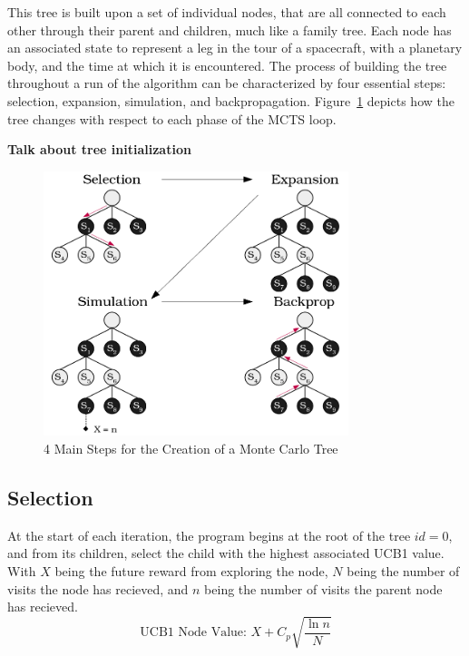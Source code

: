 \documentclass[letterpaper, preprint, paper,11pt]{AAS}	%
\begin{document}
This tree is built upon a set of individual nodes, that are all connected to each other through their parent and children, much like a family tree. Each node has an associated state to represent a leg in the tour of a spacecraft, with a planetary body, and the time at which it is encountered. The process of building the tree throughout a run of the algorithm can be characterized by four essential steps: selection, expansion, simulation, and backpropagation. Figure~\ref*{fig:mctsFunc} depicts how the tree changes with respect to each phase of the MCTS loop. 

\textbf{Talk about tree initialization}

\begin{figure}[htb]
	\centering\includegraphics[width=3.5in]{fig/mctsFuncs.png}
	\caption{4 Main Steps for the Creation of a Monte Carlo Tree}
	\label{fig:mctsFunc}
\end{figure}

\subsection{Selection} 
At the start of each iteration, the program begins at the root of the tree $id = 0$, and from its children, select the child with the highest associated UCB1 value. With $X$ being the future reward from exploring the node, $N$ being the number of visits the node has recieved, and $n$ being the number of visits the parent node has recieved. 
\begin{equation*}
    \text{UCB1 Node Value: } X + C_p \sqrt{\frac{\ln{n}}{N}}
\end{equation*}
\end{document}

